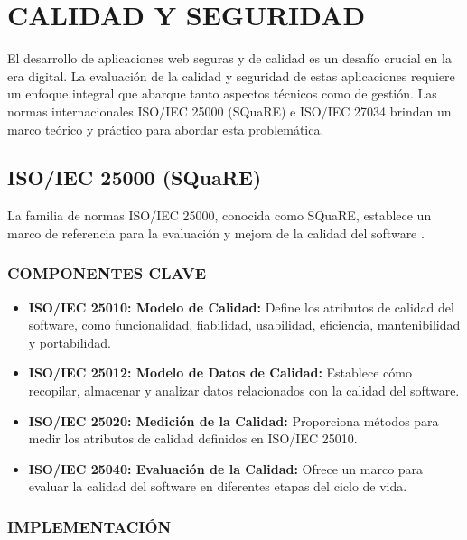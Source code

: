 \section{CALIDAD Y SEGURIDAD}

El desarrollo de aplicaciones web seguras y de calidad es un desafío crucial en la era digital. La evaluación de la calidad y seguridad de estas aplicaciones requiere un enfoque integral que abarque tanto aspectos técnicos como de gestión. Las normas internacionales ISO/IEC 25000 (SQuaRE) e ISO/IEC 27034 \citep{iso25000, iso27034} brindan un marco teórico y práctico para abordar esta problemática.

\subsection{ISO/IEC 25000 (SQuaRE)}

La familia de normas ISO/IEC 25000, conocida como SQuaRE, establece un marco de referencia para la evaluación y mejora de la calidad del software \citep{iso25000}.

\subsubsection{COMPONENTES CLAVE}

\begin{itemize}
    \item \textbf{ISO/IEC 25010: Modelo de Calidad:} Define los atributos de calidad del software, como funcionalidad, fiabilidad, usabilidad, eficiencia, mantenibilidad y portabilidad.
    \item \textbf{ISO/IEC 25012: Modelo de Datos de Calidad:} Establece cómo recopilar, almacenar y analizar datos relacionados con la calidad del software.
    \item \textbf{ISO/IEC 25020: Medición de la Calidad:} Proporciona métodos para medir los atributos de calidad definidos en ISO/IEC 25010.
    \item \textbf{ISO/IEC 25040: Evaluación de la Calidad:} Ofrece un marco para evaluar la calidad del software en diferentes etapas del ciclo de vida.
\end{itemize}

\subsubsection{IMPLEMENTACIÓN}

